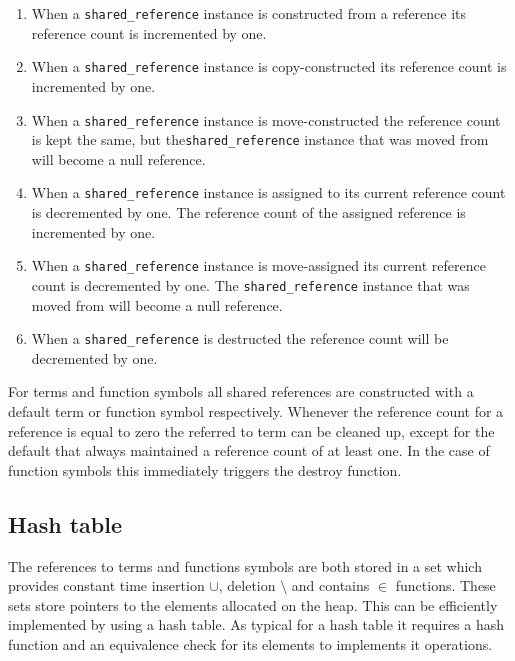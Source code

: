 \documentclass[10pt,a4paper]{article}
\theoremstyle{definition}
\begin{document}
\begin{enumerate}
  \item When a \texttt{shared\_reference} instance is constructed from a reference its reference count is incremented by one.
  
  \item When a \texttt{shared\_reference} instance is copy-constructed its reference count is incremented by one.
  
  \item When a \texttt{shared\_reference} instance is move-constructed the reference count is kept the same, but the\texttt{shared\_reference} instance that was moved from will become a null reference.
  
  \item When a \texttt{shared\_reference} instance is assigned to its current reference count is decremented by one.
  The reference count of the assigned reference is incremented by one.
  
  \item When a \texttt{shared\_reference} instance is move-assigned its current reference count is decremented by one. The \texttt{shared\_reference} instance that was moved from will become a null reference.
  
  \item When a \texttt{shared\_reference} is destructed the reference count will be decremented by one. 
\end{enumerate}

\noindent For terms and function symbols all shared references are constructed with a default term or function symbol respectively. 
Whenever the reference count for a reference is equal to zero the referred to term can be cleaned up, except for the default that always maintained a reference count of at least one.
In the case of function symbols this immediately triggers the destroy function.

\subsection{Hash table}

\newcommand{\hnr}{\textit{hnr}}
\newcommand{\hash}{\textsc{hash}}
\newcommand{\combine}{\textsc{combine}}

The references to terms and functions symbols are both stored in a set which provides constant time insertion $\cup$, deletion $\setminus$ and contains $\in$ functions.
These sets store pointers to the elements allocated on the heap.
This can be efficiently implemented by using a hash table.
As typical for a hash table it requires a hash function and an equivalence check for its elements to implements it operations.
\end{document}
